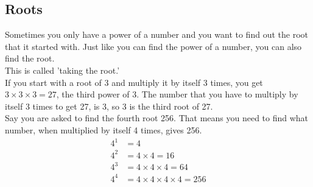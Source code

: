 \documentclass[12pt]{article}
\begin{document}
\begin{enumerate}
\vspace{28pt}

\section*{Roots}

Sometimes you only have a power of a number and you want to find out the root that it started with. Just like you can find the power of a number, you can also find the root.\\

This is called 'taking the root.'\\

If you start with a root of 3 and multiply it by itself 3 times, you get $3 \times 3 \times 3 = 27$, the third power of 3. The number that you have to multiply by itself 3 times to get 27, is 3, so 3 is the third root of 27.\\

Say you are asked to find the fourth root 256. That means you need to find what number, when multiplied by itself 4 times, gives  256.
\begin{align*}
4^1 &= 4\\
4^2 &= 4 \times 4 = 16\\
4^3 &= 4 \times 4 \times 4 = 64\\
4^4 &= 4 \times 4 \times 4 \times 4 = 256
\end{align*}


\end{enumerate}
\end{document}
